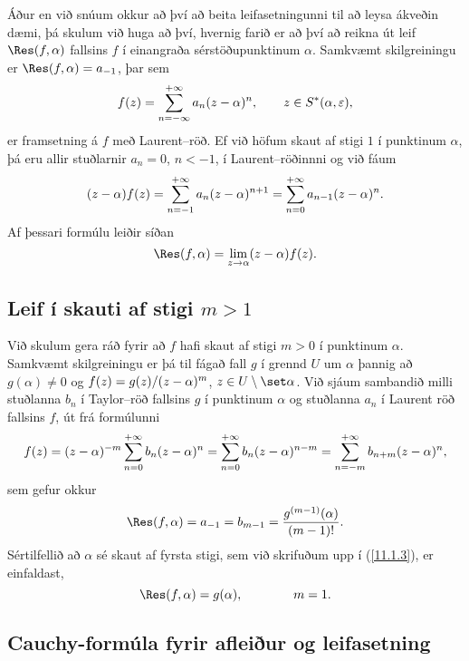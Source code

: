  {Á}ður en við snúum okkur að því að
beita leifasetningunni til að leysa ákveðin dæmi, 
þá skulum við huga að því, hvernig farið er að
því að reikna út leif  $\Res(f,\alpha)$ fallsins $f$ í einangraða
sérstöðupunktinum $\alpha$.  Samkvæmt skilgreiningu er
$\Res(f,\alpha)=a_{-1}$, þar sem 
 \begin{equation*}f(z)=\sum\limits_{n=-\infty}\sp{+\infty}a_n(z-\alpha)\sp n, \qquad
z\in S\sp *(\alpha,\varepsilon),\label{11.1.2}
 \end{equation*}
er framsetning á $f$ með Laurent--röð.  Ef við höfum skaut af stigi
$1$ í punktinum $\alpha$, þá eru allir stuðlarnir $a_n=0$, $n<-1$, í
Laurent--röðinnni og við fáum
 $$(z-\alpha)f(z)=\sum\limits_{n=-1}\sp{+\infty} a_n(z-\alpha)\sp{n+1} =
\sum\limits_{n=0}\sp{+\infty} a_{n-1}(z-\alpha)\sp{n}.
 $$
Af þessari formúlu leiðir síðan
 \begin{equation*}\Res(f,\alpha)=\lim_{z\to \alpha}(z-\alpha)f(z).\label{11.1.3}
 \end{equation*}


\subsection*{Leif í skauti af stigi $m>1$}


Við skulum gera ráð fyrir að $f$ hafi
skaut af stigi $m>0$ í punktinum $\alpha$. Samkvæmt skilgreiningu er
þá til fágað fall $g$ í 
grennd $U$ um $\alpha$ þannig að $g(\alpha)\neq 0$ og
$f(z)=g(z)/(z-\alpha)\sp m$, $z\in 
U\setminus \set \alpha$.  Við sjáum sambandið milli stuðlanna
$b_n$ í Taylor--röð fallsins $g$ í punktinum $\alpha$ og stuðlanna
$a_n$ í Laurent röð fallsins $f$, út frá formúlunni
 $$f(z)=(z-\alpha)\sp{-m}\sum_{n=0}\sp{+\infty}b_n(z-\alpha)\sp n=
\sum_{n=0}\sp{+\infty}b_n(z-\alpha)\sp {n-m}=
\sum_{n=-m}\sp{+\infty}b_{n+m}(z-\alpha)\sp {n},
 $$
sem gefur okkur
 \begin{equation*}\Res(f,\alpha)=a_{-1}=b_{m-1}=\dfrac{g\sp{(m-1)}(\alpha)}{(m-1)!}.\label{11.1.4}
 \end{equation*}
Sértilfellið að $\alpha$ sé skaut af fyrsta stigi, sem við skrifuðum
upp í  (\ref{11.1.3}), er einfaldast, 
 \begin{equation*}\Res(f,\alpha)= g(\alpha), \qquad\qquad m=1.
\label{11.1.5}
 \end{equation*}

\subsection*{Cauchy-formúla fyrir afleiður og leifasetning}

